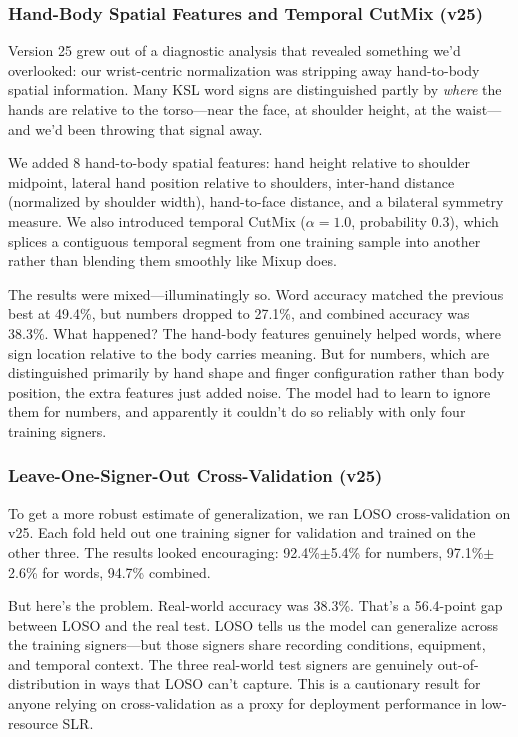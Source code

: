 \documentclass[conference]{IEEEtran}
\begin{document}
\subsubsection{Hand-Body Spatial Features and Temporal CutMix (v25)}
Version 25 grew out of a diagnostic analysis that revealed something we'd overlooked: our wrist-centric normalization was stripping away hand-to-body spatial information. Many KSL word signs are distinguished partly by \textit{where} the hands are relative to the torso---near the face, at shoulder height, at the waist---and we'd been throwing that signal away.

We added 8 hand-to-body spatial features: hand height relative to shoulder midpoint, lateral hand position relative to shoulders, inter-hand distance (normalized by shoulder width), hand-to-face distance, and a bilateral symmetry measure. We also introduced temporal CutMix ($\alpha = 1.0$, probability 0.3), which splices a contiguous temporal segment from one training sample into another rather than blending them smoothly like Mixup does.

The results were mixed---illuminatingly so. Word accuracy matched the previous best at 49.4\%, but numbers dropped to 27.1\%, and combined accuracy was 38.3\%. What happened? The hand-body features genuinely helped words, where sign location relative to the body carries meaning. But for numbers, which are distinguished primarily by hand shape and finger configuration rather than body position, the extra features just added noise. The model had to learn to ignore them for numbers, and apparently it couldn't do so reliably with only four training signers.

\subsubsection{Leave-One-Signer-Out Cross-Validation (v25)}
To get a more robust estimate of generalization, we ran LOSO cross-validation on v25. Each fold held out one training signer for validation and trained on the other three. The results looked encouraging: 92.4\%$\pm$5.4\% for numbers, 97.1\%$\pm$2.6\% for words, 94.7\% combined.

But here's the problem. Real-world accuracy was 38.3\%. That's a 56.4-point gap between LOSO and the real test. LOSO tells us the model can generalize across the training signers---but those signers share recording conditions, equipment, and temporal context. The three real-world test signers are genuinely out-of-distribution in ways that LOSO can't capture. This is a cautionary result for anyone relying on cross-validation as a proxy for deployment performance in low-resource SLR.
\end{document}
